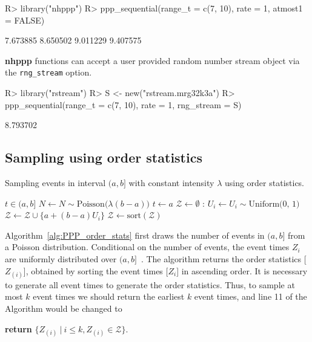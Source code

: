 \documentclass[10pt,letterpaper]{article}
\newcommand{\pkg}[1]{{\bf #1}}
\begin{document}
\begin{Schunk}
\begin{Sinput}
R> library("nhppp")
R> ppp_sequential(range_t = c(7, 10), rate = 1, atmost1 = FALSE)
\end{Sinput}
\begin{Soutput}
[1] 7.673885 8.650502 9.011229 9.407575
\end{Soutput}
\end{Schunk}

\pkg{nhppp} functions can accept a user provided random number stream object via the \texttt{rng\_stream} option.

\begin{Schunk}
\begin{Sinput}
R> library("rstream")
R> S <- new("rstream.mrg32k3a")
R> ppp_sequential(range_t = c(7, 10), rate = 1, rng_stream = S)
\end{Sinput}
\begin{Soutput}
[1] 8.793702
\end{Soutput}
\end{Schunk}


\subsection{Sampling using order statistics}\label{sec:PPP_order_stats}

\begin{algorithm}[h!]
\caption{Sampling events in interval $(a, b]$ with constant intensity $\lambda$ using order statistics. }\label{alg:PPP_order_stats}
\begin{algorithmic}[1]
\Require $t \in (a, b]$
\State $N \gets N \sim \textrm{Poisson}\big(\lambda (b-a)\big)$
\State $t \gets a$
\State $\mathcal{Z} \gets \emptyset$ 
    :
        \State $U_i \gets U_i \sim \textrm{Uniform(0, 1)}$ 
        \State $\mathcal{Z} \gets \mathcal{Z} \cup \{a + (b-a) U_i\} $ 
    \EndFor
    \State $\mathcal{Z} \gets \textrm{sort}(\mathcal{Z})$ 
\EndIf
\State
{} 
\end{algorithmic}
\end{algorithm}


Algorithm~\ref{alg:PPP_order_stats} first draws the number of events in $(a, b]$ from a Poisson distribution. Conditional on the number of events, the event times $Z_i$ are uniformly distributed over $(a, b]$~\cite[par. 4.1]{cox1965theory}. The algorithm returns the order statistics [$Z_{(i)}$], obtained by sorting the event times [$Z_i$] in ascending order. It is necessary to generate all event times to generate the order statistics. Thus, to sample at most $k$ event times we should return the earliest $k$ event times, and line 11 of the Algorithm would be changed to
\begin{center}
\textbf{return} {$\{Z_{(i)} \ | \ i \le k, Z_{(i)} \in \mathcal{Z}\}$}.
\end{center}
\end{document}
